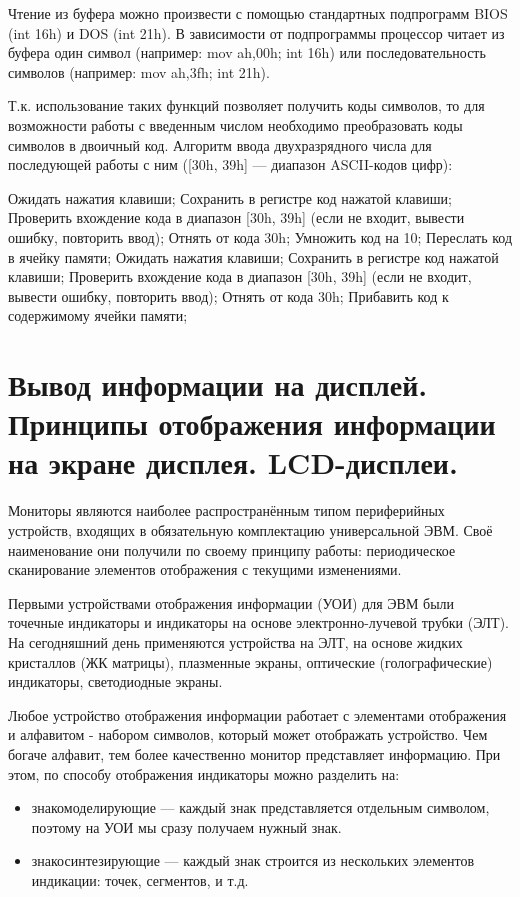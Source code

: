 \documentclass[unicode, 12pt, a4paper, oneside]{article}
\begin{document}
Чтение из буфера можно произвести с помощью стандартных подпрограмм BIOS (int 16h) и DOS (int 21h). В зависимости от подпрограммы процессор читает из буфера один символ (например: mov ah,00h; int 16h) или последовательность символов (например: mov ah,3fh; int 21h).

Т.к. использование таких функций позволяет получить коды символов, то для возможности работы с введенным числом необходимо преобразовать коды символов в двоичный код.  Алгоритм ввода двухразрядного числа для последующей работы с ним ([30h, 39h] — диапазон ASCII-кодов цифр):

Ожидать нажатия клавиши; Сохранить в регистре код нажатой клавиши; Проверить вхождение кода в диапазон [30h, 39h] (если не входит, вывести ошибку, повторить ввод); Отнять от кода 30h; Умножить код на 10; Переслать код в ячейку памяти; Ожидать нажатия клавиши; Сохранить в регистре код нажатой клавиши;  Проверить вхождение кода в диапазон [30h, 39h] (если не входит, вывести ошибку, повторить ввод); Отнять от кода 30h; Прибавить код к содержимому ячейки памяти;


\section{Вывод информации на дисплей. Принципы отображения информации на экране дисплея. LCD-{}дисплеи.}

Мониторы являются наиболее распространённым типом периферийных устройств, входящих в обязательную комплектацию универсальной ЭВМ. Своё наименование они получили по своему принципу работы: периодическое сканирование элементов отображения с текущими изменениями.

Первыми устройствами отображения информации (УОИ) для ЭВМ были точечные индикаторы и индикаторы на основе электронно-лучевой трубки (ЭЛТ). На сегодняшний день применяются устройства на ЭЛТ, на основе жидких кристаллов (ЖК матрицы), плазменные экраны, оптические (голографические) индикаторы, светодиодные экраны.

Любое устройство отображения информации работает с элементами отображения и алфавитом - набором символов, который может отображать устройство. Чем богаче алфавит, тем более качественно монитор представляет информацию. При этом, по способу отображения индикаторы можно разделить на:
\begin{itemize}
\item знакомоделирующие --- каждый знак представляется отдельным символом, поэтому на УОИ мы сразу получаем нужный знак.
\item знакосинтезирующие --- каждый знак строится из нескольких элементов индикации: точек, сегментов, и т.д.
\end{itemize}
\end{document}
